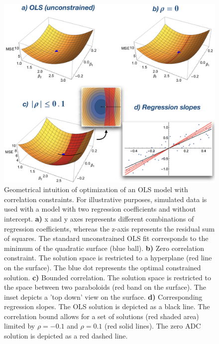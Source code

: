 \documentclass[utf8]{frontiersSCNS} %
\begin{document}
\begin{figure}[h!]
\begin{center}
\includegraphics[width=1.\textwidth]{figures/geometrical_intuition.jpeg}
\end{center}
\caption{Geometrical intuition of optimization of an OLS model with correlation constraints. For illustrative purposes, simulated data is used with a model with two regression coefficients and without intercept. \textbf{a)} x and y axes represents different combinations of regression coefficients, whereas the z-axis represents the residual sum of squares. The standard unconstrained OLS fit corresponds to the minimum of the quadratic surface (blue ball). \textbf{b)} Zero correlation constraint. The solution space is restricted to a hyperplane (red line on the surface). The blue dot represents the optimal constrained solution. \textbf{c)} Bounded correlation. The solution space is restricted to the space between two paraboloids (red band on the surface). The inset depicts a 'top down' view on the surface. \textbf{d)} Corresponding regression slopes. The OLS solution is depicted as a black line. The correlation bound allows for a set of solutions (red shaded area) limited by $\rho=-0.1$ and $\rho=0.1$ (red solid lines). The zero ADC solution is depicted as a red dashed line.}\label{fig:geometrical_intuition}
\end{figure}
\end{document}
